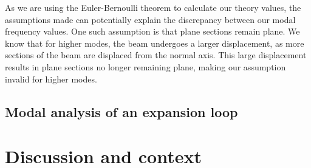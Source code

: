As we are using the Euler-Bernoulli theorem to calculate our theory values, the assumptions made can potentially explain the discrepancy between our modal frequency values. One such assumption is that plane sections remain plane. We know that for higher modes, the beam undergoes a larger displacement, as more sections of the beam are displaced from the normal axis. This large displacement results in plane sections no longer remaining plane, making our assumption invalid for higher modes.
\subsection{Modal analysis of an expansion loop}
\section{Discussion and context}